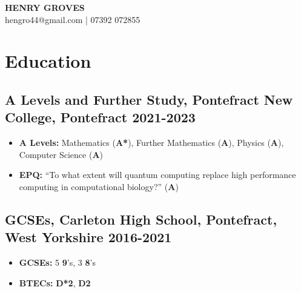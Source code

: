 \documentclass[9pt]{extarticle}
\makeatletter
\renewcommand{\maketitle}{
	\begin{center}
		{\huge\bfseries HENRY GROVES\\}
		\vspace{.5em}
		{\large hengro44@gmail.com | 07392 072855}
	\end{center}
}
\makeatother
\begin{document}
\thispagestyle{empty}
\maketitle

\begin{minipage}{0.97\textwidth}
	\section{Education}
	\subsection{A Levels and Further Study, Pontefract New College, Pontefract \hfill 2021-2023}
	\vspace{-0.2cm}
	\begin{itemize}
		\item {\bfseries A Levels:} Mathematics (\textbf{A*}), Further Mathematics (\textbf{A}), Physics (\textbf{A}), Computer Science (\textbf{A})
		\item {\bfseries EPQ: } ``To what extent will quantum computing replace high performance computing in computational biology?'' (\textbf{A})
	\end{itemize}
	\vspace{-.2cm}
	\normalsize
	\vspace{-.2cm}
	\subsection{GCSEs, Carleton High School, Pontefract, West Yorkshire \hfill 2016-2021}
	\vspace{-0.5cm}
	\begin{multicols}{3}
		\begin{itemize}
			\item \textbf{GCSEs:} 5 \textbf{9}'s, 3 \textbf{8}'s
			\item \textbf{BTECs:} \textbf{D*2}, \textbf{D2}
		\end{itemize}
	\end{multicols}

\end{minipage}
\vspace{.4cm}
\end{document}
